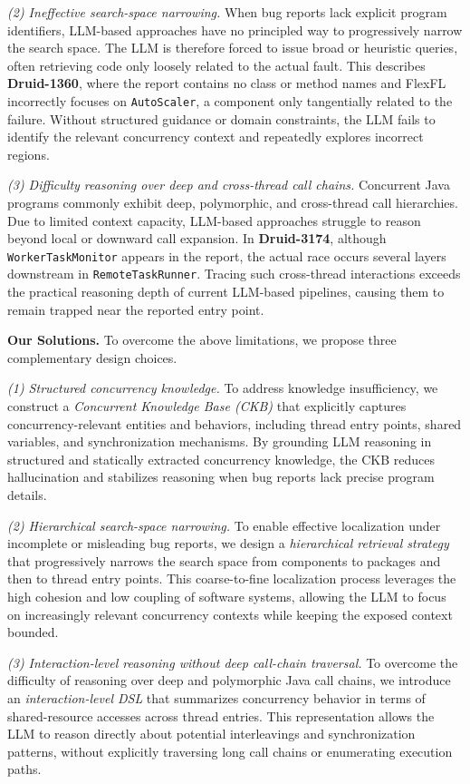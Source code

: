 \textit{(2) Ineffective search-space narrowing.}
When bug reports lack explicit program identifiers, LLM-based approaches have no principled way to progressively narrow the search space.
The LLM is therefore forced to issue broad or heuristic queries, often retrieving code only loosely related to the actual fault.
This describes \textbf{Druid-1360}, where the report contains no class or method names and FlexFL incorrectly focuses on \texttt{AutoScaler}, a component only tangentially related to the failure.
Without structured guidance or domain constraints, the LLM fails to identify the relevant concurrency context and repeatedly explores incorrect regions.

\textit{(3) Difficulty reasoning over deep and cross-thread call chains.}
Concurrent Java programs commonly exhibit deep, polymorphic, and cross-thread call hierarchies.
Due to limited context capacity, LLM-based approaches struggle to reason beyond local or downward call expansion.
In \textbf{Druid-3174}, although \texttt{WorkerTaskMonitor} appears in the report, the actual race occurs several layers downstream in \texttt{RemoteTaskRunner}.
Tracing such cross-thread interactions exceeds the practical reasoning depth of current LLM-based pipelines, causing them to remain trapped near the reported entry point.

\noindent
\textbf{Our Solutions.}
To overcome the above limitations, we propose three complementary design choices.

\textit{(1) Structured concurrency knowledge.}
To address knowledge insufficiency, we construct a \emph{Concurrent Knowledge Base (CKB)} that explicitly captures concurrency-relevant entities and behaviors, including thread entry points, shared variables, and synchronization mechanisms.
By grounding LLM reasoning in structured and statically extracted concurrency knowledge, the CKB reduces hallucination and stabilizes reasoning when bug reports lack precise program details.

\textit{(2) Hierarchical search-space narrowing.}
To enable effective localization under incomplete or misleading bug reports, we design a \emph{hierarchical retrieval strategy} that progressively narrows the search space from components to packages and then to thread entry points.
This coarse-to-fine localization process leverages the high cohesion and low coupling of software systems, allowing the LLM to focus on increasingly relevant concurrency contexts while keeping the exposed context bounded.

\textit{(3) Interaction-level reasoning without deep call-chain traversal.}
To overcome the difficulty of reasoning over deep and polymorphic Java call chains, we introduce an \emph{interaction-level DSL} that summarizes concurrency behavior in terms of shared-resource accesses across thread entries.
This representation allows the LLM to reason directly about potential interleavings and synchronization patterns, without explicitly traversing long call chains or enumerating execution paths.